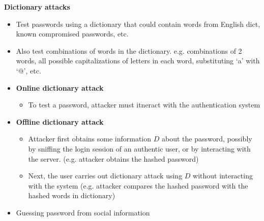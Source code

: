 \documentclass[landscape,a4paper]{extarticle}
\begin{document}
\begin{multicols*}{5}
    \textbf{Dictionary attacks}
    \begin{itemize}
        \item Test passwords using a dictionary that could contain words from English dict, known
        compromised passwords, etc.
        \item Also test combinations of words in the dictionary. e.g. combinations of 2 words, all possible capitalizations
        of letters in each word, substituting `a' with `@', etc.
        \item \textbf{Online dictionary attack}
        \begin{itemize}
            \item To test a password, attacker must itneract with the authentication system
        \end{itemize}
        \item \textbf{Offline dictionary attack}
        \begin{itemize}
            \item Attacker first obtains some information $D$ about the password, possibly by sniffing the login session
            of an authentic user, or by interacting with the server. (e.g. attacker obtains the hashed password)
            \item Next, the user carries out dictionary attack using $D$ without interacting with the system (e.g. attacker
            compares the hashed password with the hashed words in dictionary)
        \end{itemize}
        \item Guessing password from social information
    \end{itemize}


\end{multicols*}
\end{document}

